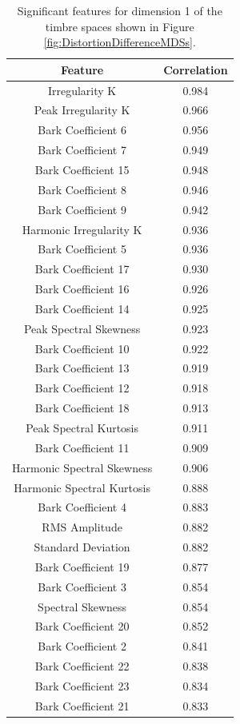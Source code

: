 		\begin{table}[h!]
			\centering
			\begin{tabular}{|c|c|}
				\hline
				\bf{Feature} & \bf{Correlation} \\
				\hline
				\hline
				Irregularity K & 0.984 \\
				\hline
				Peak Irregularity K & 0.966 \\
				\hline
				Bark Coefficient 6 & 0.956 \\
				\hline
				Bark Coefficient 7 & 0.949 \\
				\hline
				Bark Coefficient 15 & 0.948 \\
				\hline
				Bark Coefficient 8 & 0.946 \\
				\hline
				Bark Coefficient 9 & 0.942 \\
				\hline
				Harmonic Irregularity K & 0.936 \\
				\hline
				Bark Coefficient 5 & 0.936 \\
				\hline
				Bark Coefficient 17 & 0.930 \\
				\hline
				Bark Coefficient 16 & 0.926 \\
				\hline
				Bark Coefficient 14 & 0.925 \\
				\hline
				Peak Spectral Skewness & 0.923 \\
				\hline
				Bark Coefficient 10 & 0.922 \\
				\hline
				Bark Coefficient 13 & 0.919 \\
				\hline
				Bark Coefficient 12 & 0.918 \\
				\hline
				Bark Coefficient 18 & 0.913 \\
				\hline
				Peak Spectral Kurtosis & 0.911 \\
				\hline
				Bark Coefficient 11 & 0.909 \\
				\hline
				Harmonic Spectral Skewness & 0.906 \\
				\hline
				Harmonic Spectral Kurtosis & 0.888 \\
				\hline
				Bark Coefficient 4 & 0.883 \\
				\hline
				RMS Amplitude & 0.882 \\
				\hline
				Standard Deviation & 0.882 \\
				\hline
				Bark Coefficient 19 & 0.877 \\
				\hline
				Bark Coefficient 3 & 0.854 \\
				\hline
				Spectral Skewness & 0.854 \\
				\hline
				Bark Coefficient 20 & 0.852 \\
				\hline
				Bark Coefficient 2 & 0.841 \\
				\hline
				Bark Coefficient 22 & 0.838 \\
				\hline
				Bark Coefficient 23 & 0.834 \\
				\hline
				Bark Coefficient 21 & 0.833 \\
				\hline
			\end{tabular}
			\caption{Significant features for dimension 1 of the timbre spaces shown in Figure 
				 \ref{fig:DistortionDifferenceMDSs}.}
			\label{tab:DistortionDifferenceFeaturesDim1}
		\end{table}

